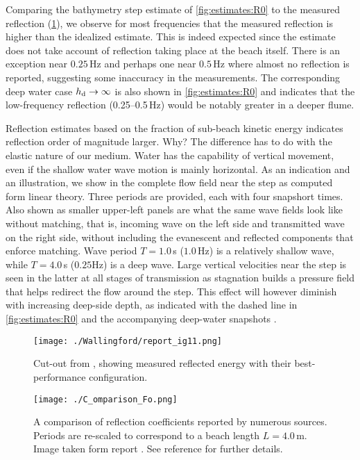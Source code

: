 \documentclass[internal]{sintefmemo}
\renewcommand{\_}[1]{_\mr{#1}}
\begin{document}
Comparing the bathymetry step estimate of \cref{fig:estimates:R0} to the measured reflection (\cref{fig:report}), we observe for most frequencies that the measured reflection is higher than the idealized estimate. 
This is indeed expected since the estimate does not take account of reflection taking place at the beach itself. 
There is an exception near $0.25$\,Hz and perhaps one near $0.5$\,Hz where almost no reflection is reported, suggesting some inaccuracy in the measurements. 
The corresponding deep water case $h\_d\to\infty$ is also shown in \cref{fig:estimates:R0} and indicates that the low-frequency reflection (0.25--0.5\,Hz) would be notably greater in a deeper flume.

Reflection estimates based on the fraction of sub-beach kinetic energy indicates reflection order of magnitude larger. 
Why?
The difference has to do with the elastic nature of our medium.
Water has the capability of vertical movement, even if the shallow water wave motion is mainly horizontal.
As an indication and an illustration, we show in  the complete flow field near the step as computed form linear theory. 
Three periods are provided, each with four snapshort times.
Also shown as smaller upper-left panels are what the same wave fields look like without matching, that is, incoming wave on the left side and transmitted wave on the right side, 
without including the evanescent and reflected components that enforce matching.
Wave period $T=1.0$\,s ($1.0$\,Hz) is a relatively shallow wave, while $T=4.0$\,s ($0.25$\;Hz) is a deep wave.
Large vertical velocities near the step is seen in the latter at all stages of transmission as stagnation builds a pressure field that helps redirect the flow around the step. 
This effect will however diminish with increasing deep-side depth, as indicated with the dashed line in \cref{fig:estimates:R0} and the accompanying deep-water snapshots . 


\begin{figure}[h!ptb]%
\centering
\texttt{[image: ./Wallingford/report\_fig11.png]}%
\caption{Cut-out from \citet{tiedeman2012}, showing measured reflected energy with their best-performance configuration.}%
\label{fig:report}%
\end{figure}

\begin{figure}%
\centering
\texttt{[image: ./C\_comparison\_SFo.png]}%
\caption{A comparison of reflection coefficients reported by numerous sources. 
Periods are re-scaled to correspond to a beach length $L=4.0$\,m.
Image taken form report \citet{SFo2022W74}. See reference for further details.
}%
\label{fig:SFo2022W74}%
\end{figure}
\end{document}
